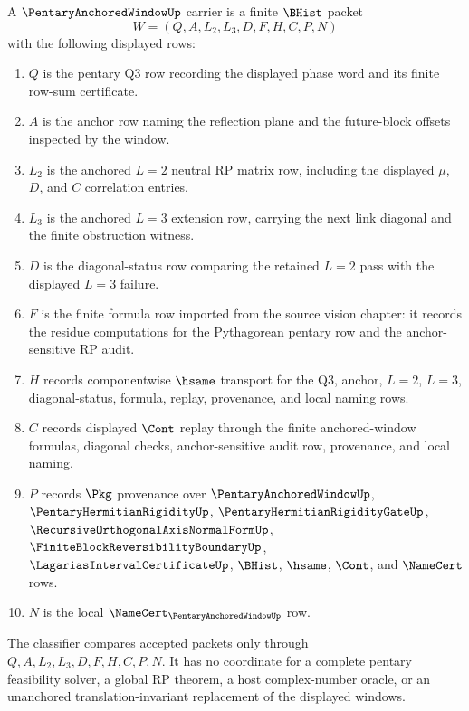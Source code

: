 \begin{definition}
\label{def:pentary-anchored-window-namecert-carrier}
A $\PentaryAnchoredWindowUp$ carrier is a finite $\BHist$ packet
$$
W=(Q,A,L_2,L_3,D,F,H,C,P,N)
$$
with the following displayed rows:
\begin{enumerate}
\item $Q$ is the pentary Q3 row recording the displayed phase word and its finite row-sum certificate.
\item $A$ is the anchor row naming the reflection plane and the future-block offsets inspected by the window.
\item $L_2$ is the anchored $L=2$ neutral RP matrix row, including the displayed $\mu$, $D$, and $C$ correlation entries.
\item $L_3$ is the anchored $L=3$ extension row, carrying the next link diagonal and the finite obstruction witness.
\item $D$ is the diagonal-status row comparing the retained $L=2$ pass with the displayed $L=3$ failure.
\item $F$ is the finite formula row imported from the source vision chapter: it records the residue computations for the Pythagorean pentary row and the anchor-sensitive RP audit.
\item $H$ records componentwise $\hsame$ transport for the Q3, anchor, $L=2$, $L=3$, diagonal-status, formula, replay, provenance, and local naming rows.
\item $C$ records displayed $\Cont$ replay through the finite anchored-window formulas, diagonal checks, anchor-sensitive audit row, provenance, and local naming.
\item $P$ records $\Pkg$ provenance over $\PentaryAnchoredWindowUp$, $\PentaryHermitianRigidityUp$, $\PentaryHermitianRigidityGateUp$, $\RecursiveOrthogonalAxisNormalFormUp$, $\FiniteBlockReversibilityBoundaryUp$, $\LagariasIntervalCertificateUp$, $\BHist$, $\hsame$, $\Cont$, and $\NameCert$ rows.
\item $N$ is the local $\NameCert_{\PentaryAnchoredWindowUp}$ row.
\end{enumerate}
The classifier compares accepted packets only through $Q,A,L_2,L_3,D,F,H,C,P,N$. It has no coordinate for a complete pentary feasibility solver, a global RP theorem, a host complex-number oracle, or an unanchored translation-invariant replacement of the displayed windows.
\end{definition}

